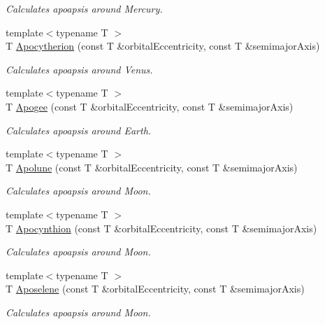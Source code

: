 \begin{DoxyCompactItemize}
\begin{DoxyCompactList}\small\item\em Calculates apoapsis around Mercury. \end{DoxyCompactList}\item 
{\footnotesize template$<$typename T $>$ }\\T \mbox{\hyperlink{group___e_g_x_phys-_apoapsis_ga59a284bb0bc11848c5b9ef1283033425}{Apocytherion}} (const T \&orbital\+Eccentricity, const T \&semimajor\+Axis)
\begin{DoxyCompactList}\small\item\em Calculates apoapsis around Venus. \end{DoxyCompactList}\item 
{\footnotesize template$<$typename T $>$ }\\T \mbox{\hyperlink{group___e_g_x_phys-_apoapsis_ga5cf587a051db28cae9e028a2b4955b0d}{Apogee}} (const T \&orbital\+Eccentricity, const T \&semimajor\+Axis)
\begin{DoxyCompactList}\small\item\em Calculates apoapsis around Earth. \end{DoxyCompactList}\item 
{\footnotesize template$<$typename T $>$ }\\T \mbox{\hyperlink{group___e_g_x_phys-_apoapsis_gacc68b49812c38394611e1ef3a8bf0e3e}{Apolune}} (const T \&orbital\+Eccentricity, const T \&semimajor\+Axis)
\begin{DoxyCompactList}\small\item\em Calculates apoapsis around Moon. \end{DoxyCompactList}\item 
{\footnotesize template$<$typename T $>$ }\\T \mbox{\hyperlink{group___e_g_x_phys-_apoapsis_ga557bb4d1a0ce7f17aaa8f8de469d4f52}{Apocynthion}} (const T \&orbital\+Eccentricity, const T \&semimajor\+Axis)
\begin{DoxyCompactList}\small\item\em Calculates apoapsis around Moon. \end{DoxyCompactList}\item 
{\footnotesize template$<$typename T $>$ }\\T \mbox{\hyperlink{group___e_g_x_phys-_apoapsis_gab61f3b2d6a5be3f62f5fb6dfdf802014}{Aposelene}} (const T \&orbital\+Eccentricity, const T \&semimajor\+Axis)
\begin{DoxyCompactList}\small\item\em Calculates apoapsis around Moon. \end{DoxyCompactList}\item 

\end{DoxyCompactItemize}
